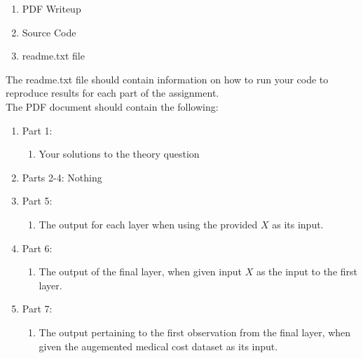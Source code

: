 \documentclass[12pt]{article}
\begin{document}
\begin{enumerate}
\item PDF Writeup
\item Source Code
\item readme.txt file
\end{enumerate}

\noindent
The readme.txt file should contain information on how to run your code to reproduce results for each part of the assignment.\\

\noindent
The PDF document should contain the following:

\begin{enumerate}
\item Part 1:
	\begin{enumerate}
	\item Your solutions to the theory question
	\end{enumerate}
\item Parts 2-4:  Nothing
\item Part 5:
	\begin{enumerate}
	\item The output for each layer when using the provided $X$ as its input.
	\end{enumerate}
\item Part 6:
	\begin{enumerate}
	\item The output of the final layer, when given input $X$ as the input to the first layer.
	\end{enumerate}
\item Part 7:
	\begin{enumerate}
	\item The output pertaining to the first observation from the final layer, when given the augemented medical cost dataset as its input.
	\end{enumerate}
\end{enumerate}
\end{document}
